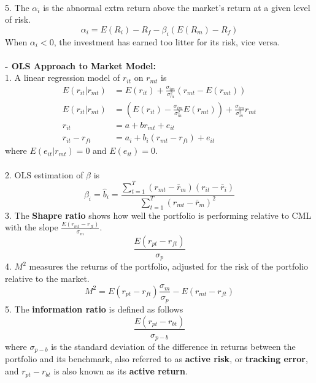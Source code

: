 \documentclass{article}
\begin{document}
\begin{enumerate}[S1 - ]
    \\
    5. The $\alpha_i$ is the abnormal extra return above the market's return at a given level of risk.
    \begin{equation*}
    \alpha_i = E(R_i)-R_f - \beta_i(E(R_m)-R_f)
    \end{equation*}
    When $\alpha_i < 0$, the investment has earned too litter for its risk, vice versa.\\
    \\
    \textbf{- OLS Approach to Market Model:}\\
    1. A linear regression model of $r_{it}$ on $r_{mt}$ is
    \begin{equation*}
    \begin{split}
    E(r_{it}|r_{mt}) & = E(r_{it}) + \frac{\sigma_{im}}{\sigma_{m}^2}(r_{mt}-E(r_{mt}))\\
    E(r_{it}|r_{mt}) & = (E(r_{it}) - \frac{\sigma_{im}}{\sigma_{m}^2}E(r_{mt})) + \frac{\sigma_{im}}{\sigma_{m}^2}r_{mt}\\
    r_{it} & = a + br_{mt} +e_{it}\\
    r_{it}-r_{ft} & = a_i +b_i(r_{mt}-r_{ft}) +e_{it}
    \end{split}
    \end{equation*}
    where $E(e_{it}|r_{mt}) = 0$ and $E(e_{it}) = 0$.\\
    \\
    2. OLS estimation of $\beta$ is
    \begin{equation*}
    \beta_i = \hat{b}_i = \frac{\sum_{t=1}^{T}(r_{mt}-\bar{r}_m)(r_{it}-\bar{r}_i)}{\sum_{t=1}^{T}(r_{mt}-\bar{r}_m)^2}
    \end{equation*}
    3. The \textbf{Shapre ratio} shows how well the portfolio is performing relative to CML with the slope $\frac{E(r_{mt}-r_{ft})}{\sigma_m}$.
    \begin{equation*}
    \frac{E(r_{pt}-r_{ft})}{\sigma_p}
    \end{equation*}
    4. $M^2$ measures the returns of the portfolio, adjusted for the risk of the portfolio relative to the market.
    \begin{equation*}
    M^2 = E(r_{pt}-r_{ft})\frac{\sigma_m}{\sigma_p} - E(r_{mt}-r_{ft})
    \end{equation*}
    5. The \textbf{information ratio} is defined as follows
    \begin{equation*}
    \frac{E(r_{pt}-r_{bt})}{\sigma_{p-b}}
    \end{equation*}
    where $\sigma_{p-b}$ is the standard deviation of the difference in returns between the portfolio and its benchmark, also referred to as \textbf{active risk}, or \textbf{tracking error}, and $r_{pt}-r_{bt}$ is also known as its \textbf{active return}.\\
    

\end{enumerate}
\end{document}
